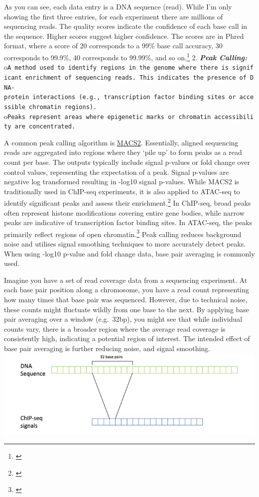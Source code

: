 \documentclass[
]{book}
\begin{document}
As you can see, each data entry is a DNA sequence (read). While I'm only showing the first three entries, for each experiment there are millions of sequencing reads. The quality scores indicate the confidence of each base call in the sequence. Higher scores suggest higher confidence. The scores are in Phred format, where a score of 20 corresponds to a 99\% base call accuracy, 30 corresponds to 99.9\%, 40 corresponds to 99.99\%, and so on.\footnote{\citet{green}}
2. \textbf{\emph{Peak Calling:}}
o\texttt{A\ method\ used\ to\ identify\ regions\ in\ the\ genome\ where\ there\ is\ significant\ enrichment\ of\ sequencing\ reads.\ This\ indicates\ the\ presence\ of\ DNA-protein\ interactions\ (e.g.,\ transcription\ factor\ binding\ sites\ or\ accessible\ chromatin\ regions).}
o\texttt{Peaks\ represent\ areas\ where\ epigenetic\ marks\ or\ chromatin\ accessibility\ are\ concentrated.}

A common peak calling algorithm is \href{https://hbctraining.github.io/Intro-to-ChIPseq/lessons/05_peak_calling_macs.html}{MACS2}. Essentially, aligned sequencing reads are aggregated into regions where they `pile up' to form peaks as a read count per base. The outputs typically include signal p-values or fold change over control values, representing the expectation of a peak. Signal p-values are negative log transformed resulting in -log10 signal p-values. While MACS2 is traditionally used in ChIP-seq experiments, it is also applied to ATAC-seq to identify significant peaks and assess their enrichment.\footnote{\citet{mistry2022}} In ChIP-seq, broad peaks often represent histone modifications covering entire gene bodies, while narrow peaks are indicative of transcription factor binding sites. In ATAC-seq, the peaks primarily reflect regions of open chromatin.\footnote{\citet{wilbanks2010}} Peak calling reduces background noise and utilises signal smoothing techniques to more accurately detect peaks. When using -log10 p-value and fold change data, base pair averaging is commonly used.

Imagine you have a set of read coverage data from a sequencing experiment. At each base pair position along a chromosome, you have a read count representing how many times that base pair was sequenced. However, due to technical noise, these counts might fluctuate wildly from one base to the next. By applying base pair averaging over a window (e.g.~32bp), you might see that while individual counts vary, there is a broader region where the average read coverage is consistently high, indicating a potential region of interest. The intended effect of base pair averaging is further reducing noise, and signal smoothing.
\includegraphics{notebook_tutorials/bp_resolution.png}
\end{document}
